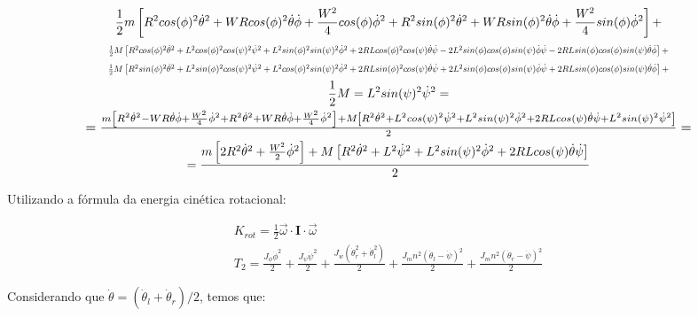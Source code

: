 \documentclass[10pt]{article}
\begin{document}
\begin{equation}
\begin{gathered}
    \frac{1}{2}m \left[R^2cos(\phi)^2\dot{\theta}^2 + WR cos(\phi)^2\dot{\theta}\dot{\phi} + \frac{W^2}{4}cos(\phi)\dot{\phi}^2 + R^2sin(\phi)^2\dot{\theta}^2 + WR sin(\phi)^2\dot{\theta}\dot{\phi} + \frac{W^2}{4}sin(\phi)\dot{\phi}^2\right] + \\
    \scalebox{0.7}{$
    \frac{1}{2}M \left[ R^2cos(\phi)^2\dot{\theta}^2 + L^2cos(\phi)^2cos(\psi)^2\dot{\psi}^2 + L^2sin(\phi)^2sin(\psi)^2\dot{\phi}^2 + 2RLcos(\phi)^2cos(\psi)\dot{\theta}\dot{\psi} - 2L^2sin(\phi)cos(\phi)sin(\psi)\dot{\phi}\dot{\psi} - 2RLsin(\phi)cos(\phi)sin(\psi)\dot{\theta}\dot{\phi} \right] +
    $}\\
    \scalebox{0.7}{$
    \frac{1}{2}M \left[ R^2sin(\phi)^2\dot{\theta}^2 + L^2sin(\phi)^2cos(\psi)^2\dot{\psi}^2 + L^2cos(\phi)^2sin(\psi)^2\dot{\phi}^2 + 2RLsin(\phi)^2cos(\psi)\dot{\theta}\dot{\psi} + 2L^2sin(\phi)cos(\phi)sin(\psi)\dot{\phi}\dot{\psi} + 2RLsin(\phi)cos(\phi)sin(\psi)\dot{\theta}\dot{\phi} \right] +
    $}\\
    \frac{1}{2}M = L^2sin(\psi)^2\dot{\psi}^2 = \\
    \scalebox{1.1}{$
    = \frac{m \left[R^2\dot{\theta}^2 - WR\dot{\theta}\dot{\phi} + \frac{W^2}{4}\dot{\phi}^2 + R^2\dot{\theta}^2 + WR\dot{\theta}\dot{\phi} + \frac{W^2}{4}\dot{\phi}^2\right] + M \left[ R^2 \dot{\theta}^2 + L^2cos(\psi)^2\dot{\psi}^2 + L^2 sin(\psi)^2 \dot{\phi}^2 + 2RL cos(\psi)\dot{\theta}\dot{\psi} + L^2sin(\psi)^2\dot{\psi}^2 \right]}{2} =
    $}\\
    = \frac{m \left[2R^2\dot{\theta}^2 + \frac{W^2}{2}\dot{\phi}^2\right] + M \left[ R^2 \dot{\theta}^2 + L^2\dot{\psi}^2 + L^2 sin(\psi)^2 \dot{\phi}^2 + 2RL cos(\psi)\dot{\theta}\dot{\psi}\right]}{2}
\end{gathered}
\end{equation}

\quad Utilizando a fórmula da energia cinética rotacional:

\begin{equation}
\begin{gathered}
    K_{rot} = \frac{1}{2} \vec{\omega} \cdot \mathbf{I} \cdot \vec{\omega} \\
    T_2 = \frac{J_{\phi}\dot{\phi}^2}{2} + \frac{J_{\psi}\dot{\psi}^2}{2} + \frac{J_w(\dot{\theta}_r^2 + \dot{\theta}_l^2)}{2} + \frac{J_m n^2(\dot{\theta}_l - \dot{\psi})^2}{2} + \frac{J_m n^2(\dot{\theta}_r - \dot{\psi})^2}{2}
\end{gathered}
\end{equation}

\quad Considerando que $\dot{\theta} = (\dot{\theta}_l + \dot{\theta}_r)/2$, temos que:
\end{document}
